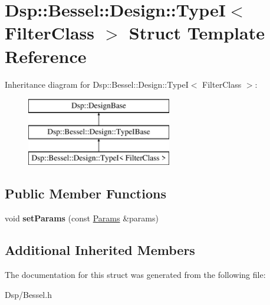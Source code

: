 \hypertarget{structDsp_1_1Bessel_1_1Design_1_1TypeI}{\section{Dsp\-:\-:Bessel\-:\-:Design\-:\-:Type\-I$<$ Filter\-Class $>$ Struct Template Reference}
\label{structDsp_1_1Bessel_1_1Design_1_1TypeI}
}
Inheritance diagram for Dsp\-:\-:Bessel\-:\-:Design\-:\-:Type\-I$<$ Filter\-Class $>$\-:\begin{figure}[H]
\begin{center}
\leavevmode
\includegraphics[height=3.000000cm]{structDsp_1_1Bessel_1_1Design_1_1TypeI}
\end{center}
\end{figure}
\subsection*{Public Member Functions}
\begin{DoxyCompactItemize}
\item 
\hypertarget{structDsp_1_1Bessel_1_1Design_1_1TypeI_af22d075d2872b778fb31dccf49ea14ae}{void {\bfseries set\-Params} (const \hyperlink{structDsp_1_1Params}{Params} \&params)}\label{structDsp_1_1Bessel_1_1Design_1_1TypeI_af22d075d2872b778fb31dccf49ea14ae}

\end{DoxyCompactItemize}
\subsection*{Additional Inherited Members}


The documentation for this struct was generated from the following file\-:\begin{DoxyCompactItemize}
\item 
Dsp/Bessel.\-h\end{DoxyCompactItemize}
